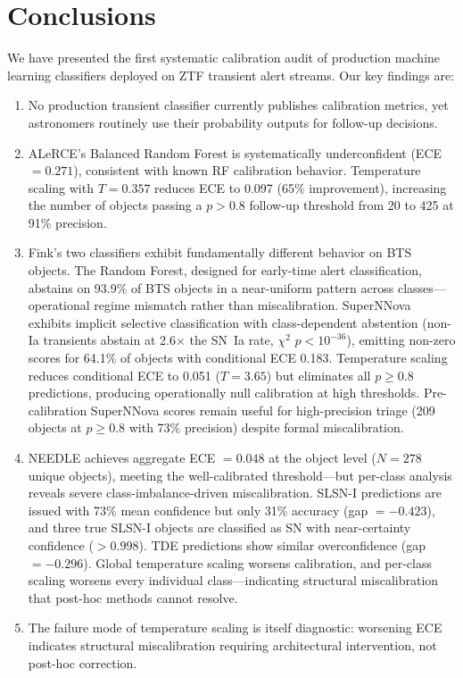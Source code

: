 \documentclass[twocolumn]{aastex631}
\begin{document}
\section{Conclusions} \label{sec:conclusions}

We have presented the first systematic calibration audit of production machine learning classifiers deployed on ZTF transient alert streams. Our key findings are:

\begin{enumerate}
    \item No production transient classifier currently publishes calibration metrics, yet astronomers routinely use their probability outputs for follow-up decisions.

    \item ALeRCE's Balanced Random Forest is systematically underconfident (ECE $= 0.271$), consistent with known RF calibration behavior. Temperature scaling with $T = 0.357$ reduces ECE to 0.097 (65\% improvement), increasing the number of objects passing a $p > 0.8$ follow-up threshold from 20 to 425 at 91\% precision.

    \item Fink's two classifiers exhibit fundamentally different behavior on BTS objects. The Random Forest, designed for early-time alert classification, abstains on 93.9\% of BTS objects in a near-uniform pattern across classes---operational regime mismatch rather than miscalibration. SuperNNova exhibits implicit selective classification with class-dependent abstention (non-Ia transients abstain at 2.6$\times$ the SN~Ia rate, $\chi^2$ $p < 10^{-36}$), emitting non-zero scores for 64.1\% of objects with conditional ECE 0.183. Temperature scaling reduces conditional ECE to 0.051 ($T = 3.65$) but eliminates all $p \ge 0.8$ predictions, producing operationally null calibration at high thresholds. Pre-calibration SuperNNova scores remain useful for high-precision triage (209 objects at $p \ge 0.8$ with 73\% precision) despite formal miscalibration.

    \item NEEDLE achieves aggregate ECE $= 0.048$ at the object level ($N = 278$ unique objects), meeting the well-calibrated threshold---but per-class analysis reveals severe class-imbalance-driven miscalibration. SLSN-I predictions are issued with 73\% mean confidence but only 31\% accuracy (gap $= -0.423$), and three true SLSN-I objects are classified as SN with near-certainty confidence ($> 0.998$). TDE predictions show similar overconfidence (gap $= -0.296$). Global temperature scaling worsens calibration, and per-class scaling worsens every individual class---indicating structural miscalibration that post-hoc methods cannot resolve.

    \item The failure mode of temperature scaling is itself diagnostic: worsening ECE indicates structural miscalibration requiring architectural intervention, not post-hoc correction.
\end{enumerate}
\end{document}
